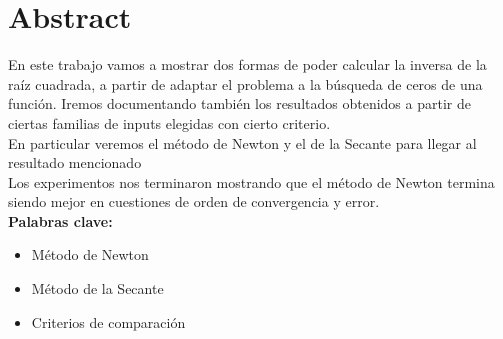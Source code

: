 \documentclass[10pt,a4paper]{article}
\begin{document}
 

\fecha{\today}





\maketitle

\section{Abstract}

En este trabajo vamos a mostrar dos formas de poder
calcular la inversa de la raíz cuadrada, a partir de adaptar el problema a la
búsqueda de ceros de una función. Iremos documentando también los resultados
obtenidos a partir de ciertas familias de inputs elegidas con cierto
criterio.\\

En particular veremos el método de Newton y el de la Secante para llegar al
resultado mencionado\\

Los experimentos nos terminaron mostrando que el método de Newton termina
siendo mejor en cuestiones de orden de convergencia y error.\\

{\bf Palabras clave:}
\begin{itemize} 
    \item Método de Newton 
    \item Método de la Secante 
    \item Criterios de comparación 
\end{itemize}
\end{document}
